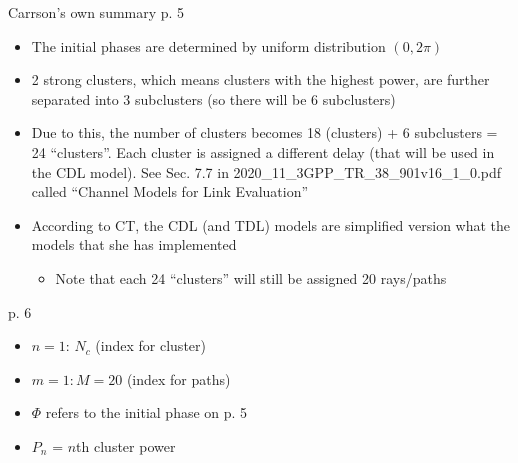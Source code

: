 \documentclass{beamer}
\begin{document}
\begin{frame}[allowframebreaks]{Carrson's own summary}
p. 5 \\
\begin{itemize}
	\item The initial phases are determined by uniform distribution $(0,2\pi)$
	\item 2 strong clusters, which means clusters with the highest power, are further separated into 3 subclusters (so there will be 6 subclusters)
	\item Due to this, the number of clusters becomes 18 (clusters) + 6 subclusters = 24 ``clusters''.  Each cluster is assigned a different delay (that will be used in the CDL model).  See Sec. 7.7 in 2020\_11\_3GPP\_TR\_38\_901v16\_1\_0.pdf called ``Channel Models for Link Evaluation''
	\item According to CT, the CDL (and TDL) models are simplified version what the models that she has implemented
	\begin{itemize}
		\item Note that each 24 ``clusters'' will still be assigned 20 rays/paths
	\end{itemize}
\end{itemize}


p. 6 \\
\begin{itemize}
	\item $n = 1$: $N_c$ (index for cluster)
	\item $m = 1:M=20$  (index for paths)
	\item $\Phi$ refers to the initial phase on p. 5
	\item $P_n$ = $n$th cluster power 
\end{itemize}


\end{frame}
\end{document}
